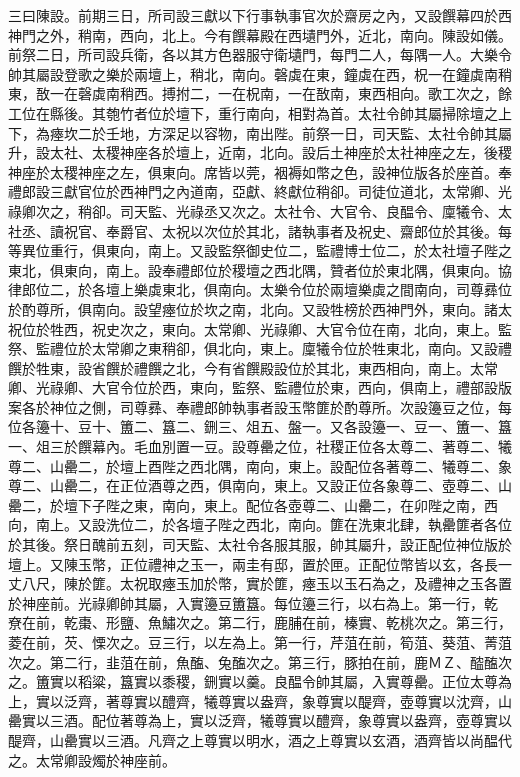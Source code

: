 \begin{pinyinscope}
 三曰陳設。前期三日，所司設三獻以下行事執事官次於齋房之內，又設饌幕四於西神門之外，稍南，西向，北上。今有饌幕殿在西壝門外，近北，南向。陳設如儀。前祭二日，所司設兵衛，各以其方色器服守衛壝門，每門二人，每隅一人。大樂令帥其屬設登歌之樂於兩壇上，稍北，南向。磬虡在東，鐘虡在西，柷一在鐘虡南稍東，敔一在磬虡南稍西。搏拊二，一在柷南，一在敔南，東西相向。歌工次之，餘工位在縣後。其匏竹者位於壇下，重行南向，相對為首。太社令帥其屬掃除壇之上下，為瘞坎二於壬地，方深足以容物，南出陛。前祭一日，司天監、太社令帥其屬升，設太社、太稷神座各於壇上，近南，北向。設后土神座於太社神座之左，後稷神座於太稷神座之左，俱東向。席皆以莞，裀褥如幣之色，設神位版各於座首。奉禮郎設三獻官位於西神門之內道南，亞獻、終獻位稍卻。司徒位道北，太常卿、光祿卿次之，稍卻。司天監、光祿丞又次之。太社令、大官令、良醖令、廩犧令、太社丞、讀祝官、奉爵官、太祝以次位於其北，諸執事者及祝史、齋郎位於其後。每等異位重行，俱東向，南上。又設監祭御史位二，監禮博士位二，於太社壇子陛之東北，俱東向，南上。設奉禮郎位於稷壇之西北隅，贊者位於東北隅，俱東向。協律郎位二，於各壇上樂虡東北，俱南向。太樂令位於兩壇樂虡之間南向，司尊彞位於酌尊所，俱南向。設望瘞位於坎之南，北向。又設牲榜於西神門外，東向。諸太祝位於牲西，祝史次之，東向。太常卿、光祿卿、大官令位在南，北向，東上。監祭、監禮位於太常卿之東稍卻，俱北向，東上。廩犧令位於牲東北，南向。又設禮饌於牲東，設省饌於禮饌之北，今有省饌殿設位於其北，東西相向，南上。太常卿、光祿卿、大官令位於西，東向，監祭、監禮位於東，西向，俱南上，禮部設版案各於神位之側，司尊彞、奉禮郎帥執事者設玉幣篚於酌尊所。次設籩豆之位，每位各籩十、豆十、簠二、簋二、鉶三、俎五、盤一。又各設籩一、豆一、簠一、簋一、俎三於饌幕內。毛血別置一豆。設尊罍之位，社稷正位各太尊二、著尊二、犧尊二、山罍二，於壇上酉陛之西北隅，南向，東上。設配位各著尊二、犧尊二、象尊二、山罍二，在正位酒尊之西，俱南向，東上。又設正位各象尊二、壺尊二、山罍二，於壇下子陛之東，南向，東上。配位各壺尊二、山罍二，在卯陛之南，西向，南上。又設洗位二，於各壇子陛之西北，南向。篚在洗東北肆，執罍篚者各位於其後。祭日醜前五刻，司天監、太社令各服其服，帥其屬升，設正配位神位版於壇上。又陳玉幣，正位禮神之玉一，兩圭有邸，置於匣。正配位幣皆以玄，各長一丈八尺，陳於篚。太祝取瘞玉加於幣，實於篚，瘞玉以玉石為之，及禮神之玉各置於神座前。光祿卿帥其屬，入實籩豆簠簋。每位籩三行，以右為上。第一行，乾尞在前，乾棗、形鹽、魚鱐次之。第二行，鹿脯在前，榛實、乾桃次之。第三行，菱在前，芡、慄次之。豆三行，以左為上。第一行，芹菹在前，筍菹、葵菹、菁菹次之。第二行，韭菹在前，魚醢、兔醢次之。第三行，豚拍在前，鹿ＭＺ、醓醢次之。簠實以稻粱，簋實以黍稷，鉶實以羹。良醖令帥其屬，入實尊罍。正位太尊為上，實以泛齊，著尊實以醴齊，犧尊實以盎齊，象尊實以醍齊，壺尊實以沈齊，山罍實以三酒。配位著尊為上，實以泛齊，犧尊實以醴齊，象尊實以盎齊，壺尊實以醍齊，山罍實以三酒。凡齊之上尊實以明水，酒之上尊實以玄酒，酒齊皆以尚醖代之。太常卿設燭於神座前。




\end{pinyinscope}
